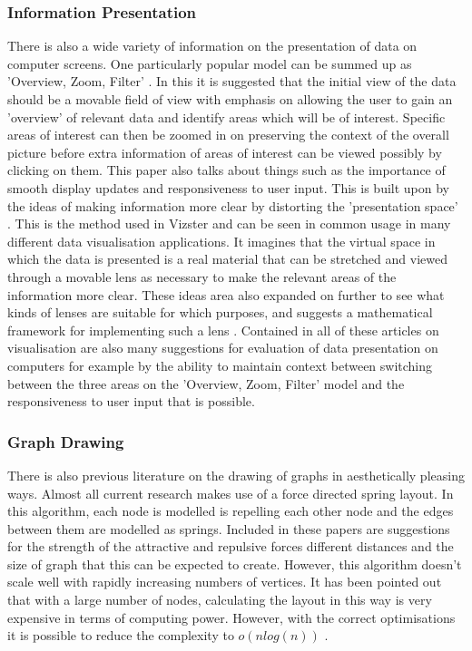 \documentclass[12pt,a4paper]{article}
\begin{document}
\subsubsection{Information Presentation}
There is also a wide variety of information on the presentation of data on computer screens. One particularly popular model can be summed up as 'Overview, Zoom, Filter' \cite{shneiderman1996eyes}. In this it is suggested that the initial view of the data should be a movable field of view with emphasis on allowing the user to gain an 'overview' of relevant data and identify areas which will be of interest. Specific areas of interest can then be zoomed in on preserving the context of the overall picture before extra information of areas of interest can be viewed possibly by clicking on them. This paper also talks about things such as the importance of smooth display updates and responsiveness to user input. This is built upon by the ideas of making information more clear by distorting the 'presentation space' \cite{carpendale2001framework}. This is the method used in Vizster and can be seen in common usage in many different data visualisation applications. It imagines that the virtual space in which the data is presented is a real material that can be stretched and viewed through a movable lens as necessary to make the relevant areas of the information more clear. These ideas area also expanded on further to see what kinds of lenses are suitable for which purposes, and suggests a mathematical framework for implementing such a lens \cite{leung1994review}. Contained in all of these articles on visualisation are also many suggestions for evaluation of data presentation on computers for example by the ability to maintain context between switching between the three areas on the 'Overview, Zoom, Filter' model and the responsiveness to user input that is possible.

\subsubsection{Graph Drawing}
There is also previous literature on the drawing of graphs in aesthetically pleasing ways. Almost all current research makes use of a force directed spring layout. In this algorithm, each node is modelled is repelling each other node and the edges between them are modelled as springs\cite{fruchterman1991graph}. Included in these papers are suggestions for the strength of the attractive and repulsive forces different distances and the size of graph that this can be expected to create. However, this algorithm doesn't scale well with rapidly increasing numbers of vertices. It has been pointed out that with a large number of nodes, calculating the layout in this way is very expensive in terms of computing power. However, with the correct optimisations it is possible to reduce the complexity to $o(nlog(n))$ \cite{barnes1986hierarchical}.
\end{document}
